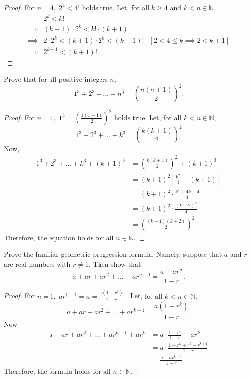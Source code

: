 \documentclass[12pt]{article}
\newenvironment{problem}[2][Problem]{\begin{trivlist}
\item[\hskip \labelsep {\bfseries #1}\hskip \labelsep {\bfseries #2.}]}{\end{trivlist}}
\begin{document}
\begin{proof}
For $n = 4, \; 2^4 < 4!$ holds true. 
Let, for all $k \geq 4$ and $k < n \in \mathbb{N}$,
\begin{align*}
    & 2^k < k! \\
    \implies & (k+1) \cdot 2^k < k!\cdot (k+1) \\
    \implies & 2\cdot 2^k < (k+1)\cdot 2^k < (k+1)! & [2 < 4 \leq k \implies 2 < k + 1] \\
    \implies & 2^{k+1} < (k+1)!
\end{align*}

\end{proof}

\begin{problem}{6}
Prove that for all positive integers \( n \),
\[
1^3 + 2^3 + \dots + n^3 = \left( \frac{n(n + 1)}{2} \right)^2.
\]

\end{problem}

\begin{proof}
For $n = 1, \; 1^3 = (\frac{1(1+1)}{2})^2$ holds true. 
Let, $\text{for all } k < n \in \mathbb{N}$, 
\[
1^3 + 2^3 + \dots + k^3 = \left( \frac{k(k + 1)}{2} \right)^2
\]
Now, \\
\begin{align*}
    1^3 + 2^3 + \dots + k^3 + (k+1)^3 & = \left( \frac{k(k + 1)}{2} \right)^2 + (k+1)^3 \\
    & = (k+1)^2[\frac{k^2}{4} + (k+1)] \\
    & = (k+1)^2 \cdot \frac{k^2 + 4k +4}{4} \\
    & = (k+1)^2 \cdot \frac{(k+2)^2}{4} \\
    & = \left( \frac{(k+1)(k+2)}{2} \right)^2
\end{align*}
Therefore, the equation holds $\text{for all } n \in \mathbb{N}$.

\end{proof}

\begin{problem}{7}
Prove the familiar geometric progression formula. Namely, suppose that \( a \) and \( r \)
are real numbers with \( r \neq 1 \). Then show that
\[
a + ar + ar^2 + \dots + ar^{n-1} = \frac{a - a r^n}{1 - r}.
\]

\end{problem}

\begin{proof}
For $n = 1, \; ar^{1-1} = a = \frac{a(1-r^1)}{1-r}$ . 
Let, $\text{for all } k < n \in \mathbb{N}$,
\[
a + ar + ar^2 + \dots + ar^{k-1} = \frac{a(1 - r^k)}{1 - r}.
\]
Now
\begin{align*}
a + ar + ar^2 + \dots + ar^{k-1} + ar^k & = a \cdot \frac{1 - r^k}{1 - r} + ar^k \\
& = a \cdot \frac{1 - r^k + r^k - r^{k+1}}{1 - r} \\
& = \frac{a - ar^{k+1}}{1 - r}
\end{align*}
Therefore, the formula holds $\text{for all } n \in \mathbb{N}$.

\end{proof}
\end{document}

